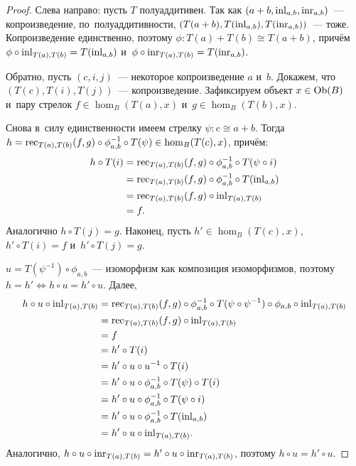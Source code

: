 \documentclass[a4paper,oneside]{article}
\begin{document}
\begin{proof}
  Слева направо: пусть $T$ полуаддитивен. Так как $(a + b,\allowbreak \mathrm{inl}_{a, b},\allowbreak \mathrm{inr}_{a, b})$~— копроизведение,
  по~полуаддитивности, $(T(a + b), T(\mathrm{inl}_{a, b}), T(\mathrm{inr}_{a, b}))$~— тоже.
  Копроизведение единственно, поэтому $\phi : T(a) + T(b) \cong T(a + b)$, причём $\phi \circ \mathrm{inl}_{T(a), T(b)} = T(\mathrm{inl}_{a, b})$
  и~$\phi \circ \mathrm{inr}_{T(a), T(b)} = T(\mathrm{inr}_{a, b})$.

  Обратно, пусть $(c, i, j)$~— некоторое копроизведение $a$ и~$b$. Докажем, что $(T(c), T(i), T(j))$~— копроизведение.
  Зафиксируем объект $x \in \mathrm{Ob}(B)$ и~пару стрелок $f \in \hom_B(T(a), x)$ и~$g \in \hom_B(T(b), x)$.

  Снова в~силу единственности имеем стрелку $\psi : c \cong a + b$.
  Тогда $h = \mathrm{rec}_{T(a), T(b)}(f, g) \circ \phi_{a, b}^{-1} \circ T(\psi) \in \hom_B(T(c), x)$, причём:
  \[
  \begin{aligned}
    h \circ T(i) &= \mathrm{rec}_{T(a), T(b)}(f, g) \circ \phi_{a, b}^{-1} \circ T(\psi \circ i) \\
                 &= \mathrm{rec}_{T(a), T(b)}(f, g) \circ \phi_{a, b}^{-1} \circ T(\mathrm{inl}_{a, b}) \\
                 &= \mathrm{rec}_{T(a), T(b)}(f, g) \circ \mathrm{inl}_{T(a), T(b)} \\
                 &= f.
  \end{aligned}
  \]
  Аналогично $h \circ T(j) = g$. Наконец, пусть $h' \in \hom_B(T(c), x)$,
  $h' \circ T(i) = f$ и~$h' \circ T(j) = g$.

  $u = T(\psi^{-1}) \circ \phi_{a, b}$~— изоморфизм как композиция изоморфизмов,
  поэтому $h = h' \Leftrightarrow h \circ u = h' \circ u$. Далее,
  \[
  \begin{aligned}
    h \circ u \circ \mathrm{inl}_{T(a), T(b)} &= \mathrm{rec}_{T(a), T(b)}(f, g) \circ \phi_{a, b}^{-1} \circ T(\psi \circ \psi^{-1}) \circ \phi_{a, b} \circ \mathrm{inl}_{T(a), T(b)} \\
                                      &= \mathrm{rec}_{T(a), T(b)}(f, g) \circ \mathrm{inl}_{T(a), T(b)} \\
                                      &= f \\
                                      &= h' \circ T(i) \\
                                      &= h' \circ u \circ u^{-1} \circ T(i) \\
                                      &= h' \circ u \circ \phi_{a,b}^{-1} \circ T(\psi) \circ T(i) \\
                                      &= h' \circ u \circ \phi_{a,b}^{-1} \circ T(\psi \circ i) \\
                                      &= h' \circ u \circ \phi_{a,b}^{-1} \circ T(\mathrm{inl}_{a, b}) \\
                                      &= h' \circ u \circ \mathrm{inl}_{T(a), T(b)}.
  \end{aligned}
  \]
  Аналогично, $h \circ u \circ \mathrm{inr}_{T(a), T(b)} = h' \circ u \circ \mathrm{inr}_{T(a), T(b)}$, поэтому $h \circ u = h' \circ u$.
\end{proof}
\end{document}
